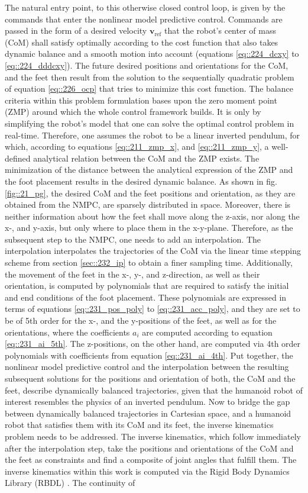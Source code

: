 The natural entry point, to this otherwise closed control loop, is given by the commands that enter the nonlinear model predictive control. Commands are passed in the form of a desired velocity $\mathbf{v}_\text{ref}$ that the robot's center of mass (CoM) shall satisfy optimally according to the cost function that also takes dynamic balance and a smooth motion into account (equations \ref{eq::224_dcxy} to \ref{eq::224_dddcxy}). The future desired positions and orientations for the CoM, and the feet then result from the solution to the sequentially quadratic problem of equation \ref{eq::226_ocp} that tries to minimize this cost function. The balance criteria within this problem formulation bases upon the zero moment point (ZMP) around which the whole control framework builds. It is only by simplifying the robot's model that one can solve the optimal control problem in real-time. Therefore, one assumes the robot to be a linear inverted pendulum, for which, according to equations \ref{eq::211_zmp_x}, and \ref{eq::211_zmp_y}, a well-defined analytical relation between the CoM and the ZMP exists. The minimization of the distance between the analytical expression of the ZMP and the foot placement results in the desired dynamic balance. As shown in fig. \ref{fig::21_pg}, the desired CoM and the feet positions and orientation, as they are obtained from the NMPC, are sparsely distributed in space. Moreover, there is neither information about how the feet shall move along the z-axis, nor along the x-, and y-axis, but only where to place them in the x-y-plane. Therefore, as the subsequent step to the NMPC, one needs to add an interpolation. The interpolation interpolates the trajectories of the CoM via the linear time stepping scheme from section \ref{sec::232_ip} to obtain a finer sampling time. Additionally, the movement of the feet in the x-, y-, and z-direction, as well as their orientation, is computed by polynomials that are required to satisfy the initial and end conditions of the foot placement. These polynomials are expressed in terms of equations \ref{eq::231_pos_poly} to \ref{eq::231_acc_poly}, and they are set to be of 5th order for the x-, and the y-positions of the feet, as well as for the orientations, where the coefficients $a_i$ are computed according to equation \ref{eq::231_ai_5th}. The z-positions, on the other hand, are computed via 4th order polynomials with coefficients from equation \ref{eq::231_ai_4th}. Put together, the nonlinear model predictive control and the interpolation between the resulting subsequent solutions for the positions and orientation of both, the CoM and the feet, describe dynamically balanced trajectories, given that the humanoid robot of interest resembles the physics of an inverted pendulum. Now to bridge the gap between dynamically balanced trajectories in Cartesian space, and a humanoid robot that satisfies them with its CoM and its feet, the inverse kinematics problem needs to be addressed. The inverse kinematics, which follow immediately after the interpolation step, take the positions and orientations of the CoM and the feet as constraints and find a composite of joint angles that fulfill them. The inverse kinematics within this work is computed via the Rigid Body Dynamics Library (RBDL) \cite{felis2017rbdl}. The continuity of 